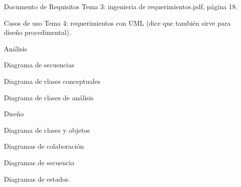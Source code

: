 \documentclass{article}
\begin{document}
\begin{section}{Documento de Requisitos}
Tema 3: ingenieria de requerimientos.pdf, página 18.
\end{section}

\begin{section}{Casos de uso}
Tema 4: requerimientos con UML (dice que también sirve para diseño procedimental).
\end{section}

\begin{section}{Análisis}
  \begin{subsection}{Diagrama de secuencias}
  \end{subsection}

  \begin{subsection}{Diagrama de clases conceptuales}  
  \end{subsection}

  \begin{subsection}{Diagrama de clases de análisis}
  \end{subsection}
\end{section}

\begin{section}{Diseño}
  \begin{subsection}{Diagrama de clases y objetos}
  \end{subsection}

  \begin{subsection}{Diagramas de colaboración}
  \end{subsection}

  \begin{subsection}{Diagramas de secuencia}
  \end{subsection}

  \begin{subsection}{Diagramas de estados.}
  \end{subsection}
\end{section}
\end{document}
